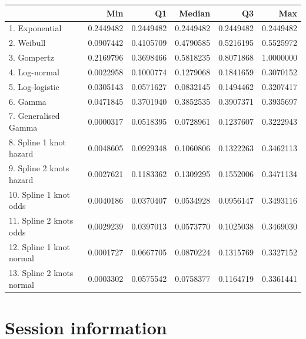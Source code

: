 \documentclass[]{article}
\begin{document}
\begin{tabular}{lrrrrr}
\toprule
  & Min & Q1 & Median & Q3 & Max\\
\midrule
\rowcolor{gray!6}  1. Exponential & 0.2449482 & 0.2449482 & 0.2449482 & 0.2449482 & 0.2449482\\
2. Weibull & 0.0907442 & 0.4105709 & 0.4790585 & 0.5216195 & 0.5525972\\
\rowcolor{gray!6}  3. Gompertz & 0.2169796 & 0.3698466 & 0.5818235 & 0.8071868 & 1.0000000\\
4. Log-normal & 0.0022958 & 0.1000774 & 0.1279068 & 0.1841659 & 0.3070152\\
\rowcolor{gray!6}  5. Log-logistic & 0.0305143 & 0.0571627 & 0.0832145 & 0.1494462 & 0.3207417\\
6. Gamma & 0.0471845 & 0.3701940 & 0.3852535 & 0.3907371 & 0.3935697\\
\rowcolor{gray!6}  7. Generalised Gamma & 0.0000317 & 0.0518395 & 0.0728961 & 0.1237607 & 0.3222943\\
8. Spline 1 knot hazard & 0.0048605 & 0.0929348 & 0.1060806 & 0.1322263 & 0.3462113\\
\rowcolor{gray!6}  9. Spline 2 knots hazard & 0.0027621 & 0.1183362 & 0.1309295 & 0.1552006 & 0.3471134\\
10. Spline 1 knot odds & 0.0040186 & 0.0370407 & 0.0534928 & 0.0956147 & 0.3493116\\
\rowcolor{gray!6}  11. Spline 2 knots odds & 0.0029239 & 0.0397013 & 0.0573770 & 0.1025038 & 0.3469030\\
12. Spline 1 knot normal & 0.0001727 & 0.0667705 & 0.0870224 & 0.1315769 & 0.3327152\\
\rowcolor{gray!6}  13. Spline 2 knots normal & 0.0003302 & 0.0575542 & 0.0758377 & 0.1164719 & 0.3361441\\
\bottomrule
\end{tabular}

\newpage

\section{Session information}\label{session-information}
\end{document}

